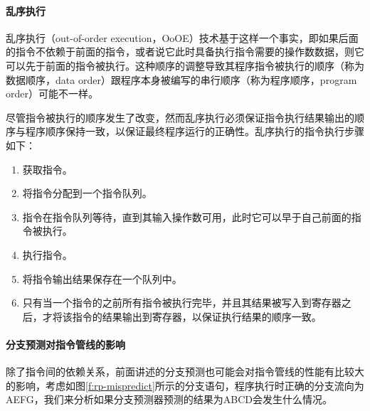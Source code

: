 \paragraph{乱序执行}
乱序执行（out-of-order execution，OoOE）技术基于这样一个事实，即如果后面的指令不依赖于前面的指令，或者说它此时具备执行指令需要的操作数数据，则它可以先于前面的指令被执行。这种顺序的调整导致其程序指令被执行的顺序（称为数据顺序，data order）跟程序本身被编写的串行顺序（称为程序顺序，program order）可能不一样。

尽管指令被执行的顺序发生了改变，然而乱序执行必须保证指令执行结果输出的顺序与程序顺序保持一致，以保证最终程序运行的正确性。乱序执行的指令执行步骤如下：

\begin{enumerate}
	\item 获取指令。
	\item 将指令分配到一个指令队列。
	\item 指令在指令队列等待，直到其输入操作数可用，此时它可以早于自己前面的指令被执行。  
	\item 执行指令。
	\item 将指令输出结果保存在一个队列中。 
	\item 只有当一个指令的之前所有指令被执行完毕，并且其结果被写入到寄存器之后，才将该指令的结果输出到寄存器，以保证执行结果的顺序一致。
\end{enumerate}




\paragraph{分支预测对指令管线的影响}
除了指令间的依赖关系，前面讲述的分支预测也可能会对指令管线的性能有比较大的影响，考虑如图\ref{f:rp-mispredict}所示的分支语句，程序执行时正确的分支流向为AEFG，我们来分析如果分支预测器预测的结果为ABCD会发生什么情况。


